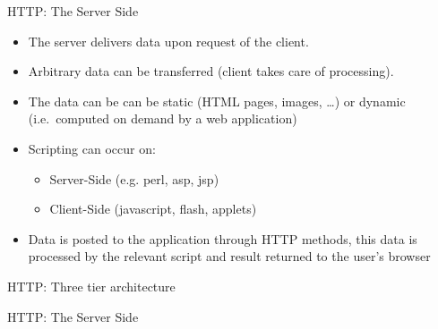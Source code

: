 \documentclass{beamer}
\begin{document}
\begin{slide}{HTTP: The Server Side}
  \begin{itemize}\itemsep=1ex
    \item The server delivers data upon request of the client.
    \item Arbitrary data can be transferred (client takes care of
      processing).
    \item The data can be can be static (HTML pages, images, \ldots) or
     dynamic (i.e.~computed on demand by a web application)
   \item Scripting can occur on:
     \begin{itemize}
     \item Server-Side (e.g. perl, asp, jsp)
     \item Client-Side (javascript, flash, applets)
     \end{itemize}
   \item Data is posted to the application through HTTP methods, this
     data is processed by the relevant script and result returned to
     the user's browser
  \end{itemize}
\end{slide}

\begin{slide}{HTTP: Three tier architecture}
    \begin{center}
    \end{center} 
\end{slide}

\begin{slide}{HTTP: The Server Side}
    \begin{center}
    \end{center} 
\end{slide}
\end{document}
